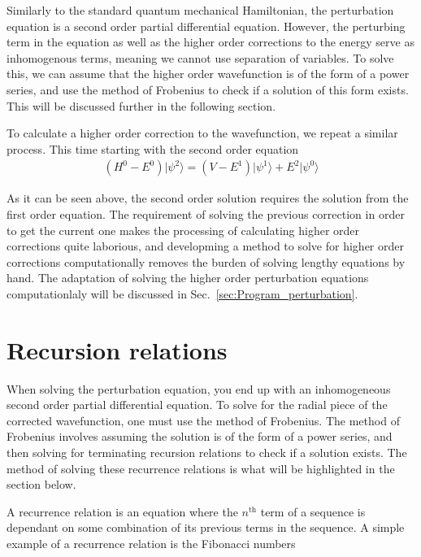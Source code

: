         Similarly to the standard quantum mechanical Hamiltonian, the perturbation equation is a second order partial differential equation. However, the perturbing term in the equation as well as the higher order corrections to the energy serve as inhomogenous terms, meaning we cannot use separation of variables. To solve this, we can assume that the higher order wavefunction is of the form of a power series, and use the method of Frobenius to check if a solution of this form exists. This will be discussed further in the following section. 

        To calculate a higher order correction to the wavefunction, we repeat a similar process. This time starting with the second order equation
        \begin{align}
            \left( H^0 - E^0 \right) \vert \psi^2 \rangle = \left(V - E^1 \right) \vert \psi^1 \rangle + E^2 \vert \psi^0 \rangle
        \end{align}

        As it can be seen above, the second order solution requires the solution from the first order equation. The requirement of solving the previous correction in order to get the current one makes the processing of calculating higher order corrections quite laborious, and developming a method to solve for higher order corrections computationally removes the burden of solving lengthy equations by hand. The adaptation of solving the higher order perturbation equations computationlaly will be discussed in Sec.~\ref{sec:Program_perturbation}.

    \section{Recursion relations} \label{sec:Recursion_Relations}
        When solving the perturbation equation, you end up with an inhomogeneous second order partial differential equation. To solve for the radial piece of the corrected wavefunction, one must use the method of Frobenius. The method of Frobenius involves assuming the solution is of the form of a power series, and then solving for terminating recursion relations to check if a solution exists. The method of solving these recurrence relations is what will be highlighted in the section below. 

        A recurrence relation is an equation where the $n^{\text{th}}$ term of a sequence is dependant on some combination of its previous terms in the sequence. A simple example of a recurrence relation is the Fibonacci numbers

